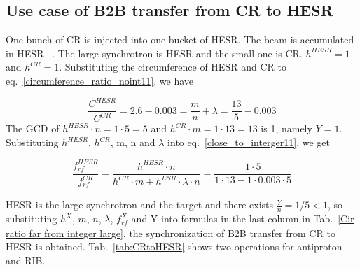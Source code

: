 \subsection{Use case of B2B transfer from CR to HESR} 

One bunch of CR is injected into one bucket of HESR. The beam is accumulated in HESR ~\cite{toelle_hesr_2007}. The large synchrotron is HESR and the small one is CR. $h^{\mathit{HESR}}=1$ and $h^{\mathit{CR}}=1$. Substituting the circumference of HESR and CR to eq.~\ref{circumference_ratio_noint11}, we have

\begin{equation}
\frac{C^{\mathit{HESR}}}{C^{\mathit{CR}}}=2.6-0.003=\frac{m}{n}+ \lambda = \frac{13}{5}-0.003
\end{equation}
The GCD of $h^{\mathit{HESR}}\cdot n=1\cdot5=5$ and $h^{\mathit{CR}} \cdot m=1\cdot 13=13$ is 1, namely $Y=1$. Substituting $h^{\mathit{HESR}}$, $h^{\mathit{CR}}$, m, n and $\lambda$ into eq.~\ref{close_to_interger11}, we get

\begin{equation} 
\frac{f_{\mathit{rf}}^{\mathit{HESR}}}{f_{\mathit{rf}}^{\mathit{CR}}}=\frac{h^{\mathit{HESR}}\cdot n}{h^{\mathit{CR}} \cdot m+ h^{\mathit{ESR}} \cdot\lambda\cdot n}=\frac{1\cdot 5}{1 \cdot 13- 1 \cdot 0.003\cdot 5}
\end{equation}

HESR is the large synchrotron and the target and there exists $\frac{Y}{n}=1/5<1$, so substituting $h^X$, $m$, $n$, $\lambda$, $f_{\mathit{rf}}^{X}$ and Y into formulas in the last column in Tab.~\ref{Cir ratio far from integer large}, the synchronization of B2B transfer from CR to HESR is obtained. Tab.~\ref{tab:CRtoHESR} shows two operations for antiproton and RIB.


